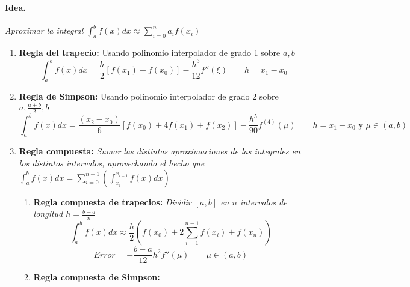 \paragraph{Idea.} \textit{Aproximar la integral $\int_a^b f(x) dx \approx \sum_{i=0}^n a_i f(x_i)$}

\begin{enumerate}
    \item \textbf{Regla del trapecio:} Usando polinomio interpolador de grado 1 sobre $a, b$
    $$\int_a^b f(x) dx = \frac{h}{2}[f(x_1) - f(x_0)] - \frac{h^3}{12}f''(\xi) \qquad h = x_1 - x_0$$
    \item \textbf{Regla de Simpson:} Usando polinomio interpolador de grado 2 sobre $a, \frac{a+b}{2}, b$
    $$\int_a^b f(x) dx = \frac{(x_2-x_0)}{6}[f(x_0) + 4f(x_1)+f(x_2)] - \frac{h^5}{90}f^{(4)}(\mu) \qquad h = x_1 - x_0 \text{ y } \mu \in (a,b)$$
    \item \textbf{Regla compuesta:} \textit{Sumar las distintas aproximaciones de las integrales en los distintos intervalos, aprovechando el hecho que $\int_a^b f(x) dx = \sum_{i=0}^{n-1}(\int_{x_i}^{x_{i+1}} f(x) dx)$}
        \begin{enumerate}
            \item \textbf{Regla compuesta de trapecios:} \textit{Dividir $[a,b]$ en $n$ intervalos de longitud $h = \frac{b-a}{n}$}
            $$\int_a^b f(x) dx \approx \frac{h}{2} \left( f(x_0) + 2 \sum_{i=1}^{n-1}f(x_i)+f(x_n) \right)$$
            $$Error = -\frac{b-a}{12} h^2 f''(\mu) \qquad \mu \in (a,b)$$
            \item \textbf{Regla compuesta de Simpson:}
        \end{enumerate}
    
\end{enumerate}
